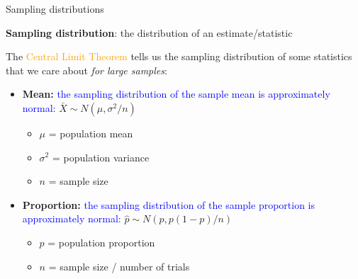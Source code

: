 \documentclass[10pt,t]{beamer}
\begin{document}
\begin{frame}{Sampling distributions}

\textbf{Sampling distribution}: the distribution of an estimate/statistic

\vspace{0.3cm}

The \textcolor{orange}{Central Limit Theorem} tells us the sampling distribution of some statistics that we care about \textit{for large samples}:

\begin{itemize}
	\item \textbf{Mean:} \textcolor{blue}{the sampling distribution of the sample mean is approximately normal:} $\bar{X} \sim N(\mu, \sigma^2 / n)$
	\begin{itemize}
		\item $\mu$ = population mean
		\item $\sigma^2$ = population variance
		\item $n$ = sample size
	\end{itemize}
	\item \textbf{Proportion:} \textcolor{blue}{the sampling distribution of the sample proportion is approximately normal:} $ \hat{p} \sim N(p, p(1-p)/n)$
	\begin{itemize}
		\item $p$ = population proportion
		\item $n$ = sample size / number of trials
	\end{itemize}
\end{itemize}
\end{frame}
\end{document}
